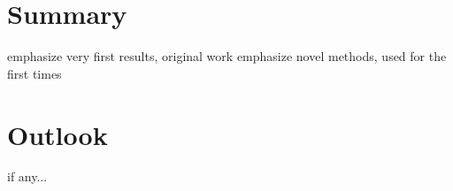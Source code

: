 \section{Summary}

\> emphasize very first results, original work
\> emphasize novel methods, used for the first times



\section{Outlook}

\> if any...

